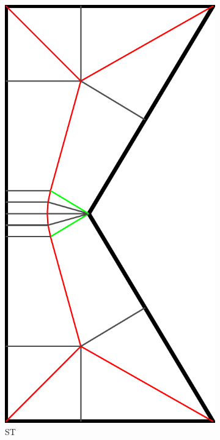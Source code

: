 \begin{figure}
\begin{subfigure}{\figwidth}
\includegraphics[width=\figwidthTwo]{sources/method/simple_skeleton_st}
\caption{ST}\label{shape_decomposition_st}
\end{subfigure}
\begin{subfigure}{\figwidth}\centering

\end{subfigure}
\end{figure}
